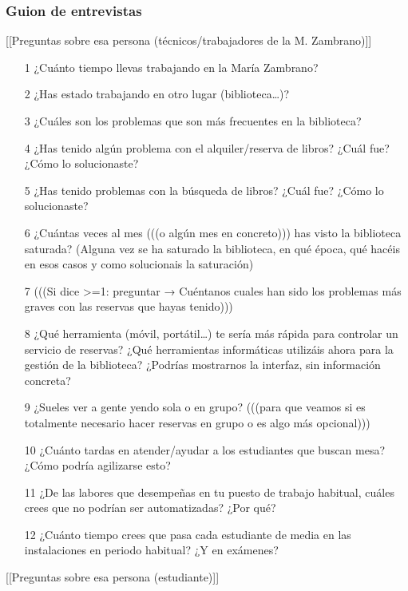\documentclass[12pt]{article}
\begin{document}
\subsubsection{Guion de entrevistas}

[[Preguntas sobre esa persona (técnicos/trabajadores de la M. Zambrano)]] 
\begin{itemize}


\item[1]¿Cuánto tiempo llevas trabajando en la María Zambrano?  
\item[2]¿Has estado trabajando en otro lugar (biblioteca…)? 
\item[3]¿Cuáles son los problemas que son más frecuentes en la biblioteca? 
\item[4]¿Has tenido algún problema con el alquiler/reserva de libros? ¿Cuál fue? ¿Cómo lo solucionaste?
\item[5]¿Has tenido problemas con la búsqueda de libros? ¿Cuál fue? ¿Cómo lo solucionaste?
\item[6]¿Cuántas veces al mes (((o algún mes en concreto))) has visto la biblioteca saturada? (Alguna vez se ha saturado la biblioteca, en qué época, qué hacéis en esos casos y como solucionais la saturación)
\item[7](((Si dice >=1: preguntar → Cuéntanos cuales han sido los problemas más graves con las reservas que hayas tenido)))
\item[8]¿Qué herramienta (móvil, portátil…) te sería más rápida para controlar un servicio de reservas? ¿Qué herramientas informáticas utilizáis ahora para la gestión de la biblioteca? ¿Podrías mostrarnos la interfaz, sin información concreta? 
\item[9]¿Sueles ver a gente yendo sola o en grupo? (((para que veamos si es totalmente necesario hacer reservas en grupo o es algo más opcional))) 
\item[10]¿Cuánto tardas en atender/ayudar a los estudiantes que buscan mesa? ¿Cómo podría agilizarse esto? 
\item[11]¿De las labores que desempeñas en tu puesto de trabajo habitual, cuáles crees que no podrían ser automatizadas? ¿Por qué? 
\item[12]¿Cuánto tiempo crees que pasa cada estudiante de media en las instalaciones en periodo habitual? ¿Y en exámenes? 

\end{itemize}

[[Preguntas sobre esa persona (estudiante)]]
\end{document}
